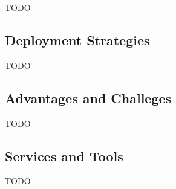 TODO

\subsection{Deployment Strategies}
\label{ssec:cloud-infrastructures-deployment-strategies}

TODO

\subsection{Advantages and Challeges}
\label{ssec:cloud-infrastructures-advantages-and-challeges}

TODO

\subsection{Services and Tools}
\label{ssec:services-and-tools}

TODO
